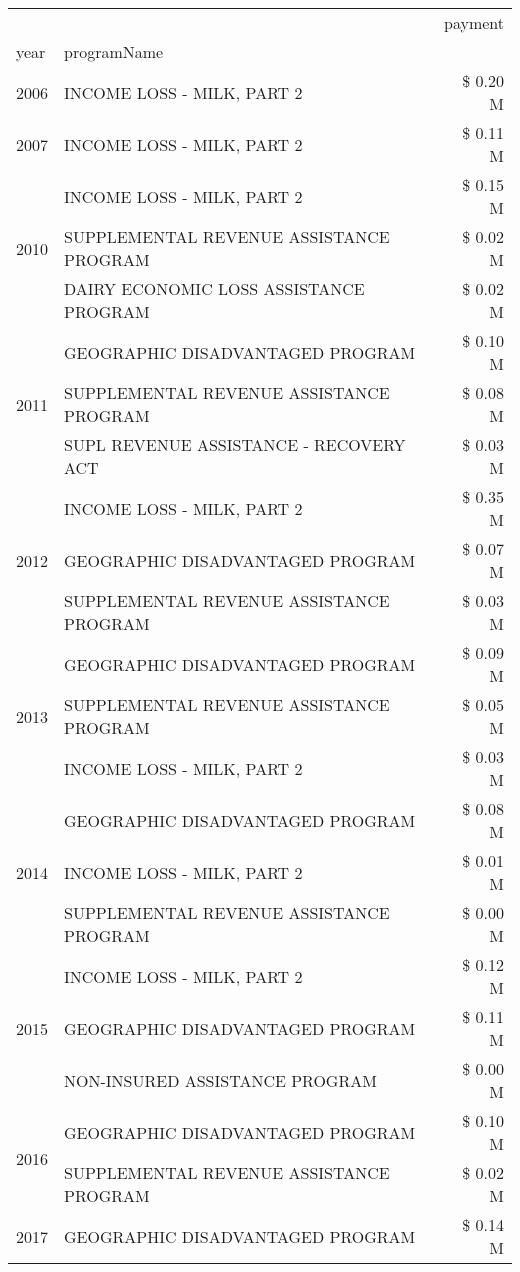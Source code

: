 \begin{tabular}{llr}
\toprule
 &  & payment \\
year & programName &  \\
\midrule
2006 & INCOME LOSS - MILK, PART 2 & \$ 0.20 M \\
\cline{1-3}
2007 & INCOME LOSS - MILK, PART 2 & \$ 0.11 M \\
\cline{1-3}
\multirow[t]{3}{*}{2010} & INCOME LOSS - MILK, PART 2 & \$ 0.15 M \\
 & SUPPLEMENTAL REVENUE ASSISTANCE PROGRAM & \$ 0.02 M \\
 & DAIRY ECONOMIC LOSS ASSISTANCE PROGRAM & \$ 0.02 M \\
\cline{1-3}
\multirow[t]{3}{*}{2011} & GEOGRAPHIC DISADVANTAGED PROGRAM & \$ 0.10 M \\
 & SUPPLEMENTAL REVENUE ASSISTANCE PROGRAM & \$ 0.08 M \\
 & SUPL REVENUE ASSISTANCE - RECOVERY ACT & \$ 0.03 M \\
\cline{1-3}
\multirow[t]{3}{*}{2012} & INCOME LOSS - MILK, PART 2 & \$ 0.35 M \\
 & GEOGRAPHIC DISADVANTAGED PROGRAM & \$ 0.07 M \\
 & SUPPLEMENTAL REVENUE ASSISTANCE PROGRAM & \$ 0.03 M \\
\cline{1-3}
\multirow[t]{3}{*}{2013} & GEOGRAPHIC DISADVANTAGED PROGRAM & \$ 0.09 M \\
 & SUPPLEMENTAL REVENUE ASSISTANCE PROGRAM & \$ 0.05 M \\
 & INCOME LOSS - MILK, PART 2 & \$ 0.03 M \\
\cline{1-3}
\multirow[t]{3}{*}{2014} & GEOGRAPHIC DISADVANTAGED PROGRAM & \$ 0.08 M \\
 & INCOME LOSS - MILK, PART 2 & \$ 0.01 M \\
 & SUPPLEMENTAL REVENUE ASSISTANCE PROGRAM & \$ 0.00 M \\
\cline{1-3}
\multirow[t]{3}{*}{2015} & INCOME LOSS - MILK, PART 2 & \$ 0.12 M \\
 & GEOGRAPHIC DISADVANTAGED PROGRAM & \$ 0.11 M \\
 & NON-INSURED ASSISTANCE PROGRAM & \$ 0.00 M \\
\cline{1-3}
\multirow[t]{2}{*}{2016} & GEOGRAPHIC DISADVANTAGED PROGRAM & \$ 0.10 M \\
 & SUPPLEMENTAL REVENUE ASSISTANCE PROGRAM & \$ 0.02 M \\
\cline{1-3}
\multirow[t]{2}{*}{2017} & GEOGRAPHIC DISADVANTAGED PROGRAM & \$ 0.14 M \\

\end{tabular}
